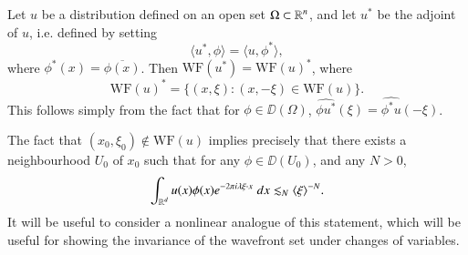 \begin{example}
    Let $u$ be a distribution defined on an open set $\Omega \subset \operatorname{\mathbb{R}}^n$, and let $u^*$ be the adjoint of $u$, i.e. defined by setting
    \[ \langle u^*, \phi \rangle = \langle u, \phi^* \rangle, \]
    where $\phi^*(x) = \overline{\phi(x)}$. Then $\text{WF}(u^*) = \text{WF}(u)^*$, where
    \[ \text{WF}(u)^* = \{ (x,\xi) : (x,-\xi) \in \text{WF}(u) \}. \]
    This follows simply from the fact that for $\phi \in \DD(\Omega)$, $\widehat{\phi u^*}(\xi) = \widehat{\phi^* u}(-\xi)$.
\end{example}

The fact that $(x_0,\xi_0) \not \in \text{WF}(u)$ implies precisely that there exists a neighbourhood $U_0$ of $x_0$ such that for any $\phi \in \DD(U_0)$, and any $N > 0$,
%
\[ \int_{\operatorname{\mathbb{R}}^d} u(x) \phi(x) e^{-2 \pi i \lambda \xi \cdot x}\; dx \lesssim_N \langle \xi \rangle^{-N}. \]
%
It will be useful to consider a nonlinear analogue of this statement, which will be useful for showing the invariance of the wavefront set under changes of variables.

